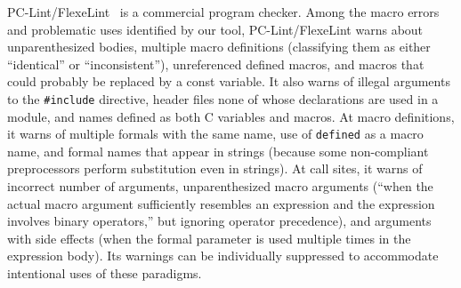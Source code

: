 \documentclass[10pt]{article}
\begin{document}


PC-Lint/FlexeLint~\cite{Gimpel} is a commercial program checker.  Among the
macro errors and problematic uses identified by our tool, PC-Lint/FlexeLint
warns about unparenthesized bodies, multiple macro definitions (classifying
them as either ``identical'' or ``inconsistent''), unreferenced defined macros, and
macros that could probably be replaced by a const variable.  It also warns
of illegal arguments to the {\tt \#include} directive, header files
none of whose declarations are used in a module, and names defined as both
C variables and macros.  At macro definitions, it warns of multiple formals
with the same name, use of {\tt defined} as a macro name, and formal names
that appear in strings (because some non-compliant preprocessors perform
substitution even in strings).  At call sites, it warns of incorrect number
of arguments, unparenthesized macro arguments (``when the actual macro
argument sufficiently resembles an expression and the expression involves
binary operators,'' but ignoring operator precedence), and arguments with
side effects (when the formal parameter is used multiple times in the
expression body).  Its warnings can be individually suppressed to
accommodate intentional uses of these paradigms.
\end{document}
